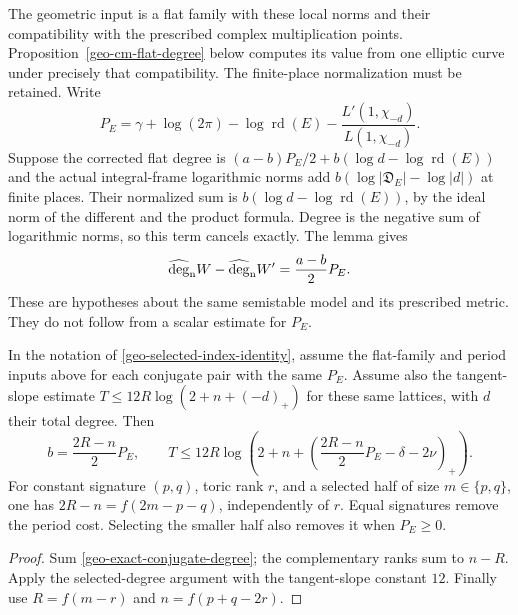The geometric input is a flat family with these local norms and their
compatibility with the prescribed complex multiplication points.
Proposition~\ref{geo-cm-flat-degree} below computes its value from one
elliptic curve under precisely that compatibility. The finite-place
normalization must be retained. Write
\[
 P_E=\gamma+\log(2\pi)-\log\operatorname{rd}(E)
                      -\frac{L'(1,\chi_{-d})}{L(1,\chi_{-d})}.
\]
Suppose the corrected flat degree is
$(a-b)P_E/2+b(\log d-\log\operatorname{rd}(E))$ and the actual
integral-frame logarithmic norms add
$b(\log|\mathfrak D_E|-\log|d|)$ at finite places. Their normalized
sum is $b(\log d-\log\operatorname{rd}(E))$, by the ideal norm
of the different and the product formula. Degree is the negative
sum of logarithmic norms, so this term cancels exactly. The lemma gives
\begin{equation}\label{geo-exact-conjugate-degree}
 \widehat{\deg}_{\rm n}W-\widehat{\deg}_{\rm n}W'
                         =\frac{a-b}{2}P_E.
\end{equation}
These are hypotheses about the same semistable model and its prescribed
metric. They do not follow from a scalar estimate for $P_E$.

\begin{corollary}\label{geo-signed-signature-budget}
In the notation of \eqref{geo-selected-index-identity}, assume the
flat-family and period inputs above for each conjugate pair with the
same $P_E$. Assume also the tangent-slope estimate
$T\le12R\log(2+n+(-d)_+)$ for these same lattices, with $d$ their
total degree. Then
\[
 b=\frac{2R-n}{2}P_E,\qquad
 T\le12R\log\left(2+n+
       \left(\frac{2R-n}{2}P_E-\delta-2\nu\right)_+\right).
\]
For constant signature $(p,q)$, toric rank $r$, and a selected half
of size $m\in\{p,q\}$, one has
$2R-n=f(2m-p-q)$, independently of $r$. Equal signatures remove
the period cost. Selecting the smaller half also removes it when
$P_E\ge0$.
\end{corollary}
\begin{proof}
Sum \eqref{geo-exact-conjugate-degree}; the complementary ranks sum
to $n-R$. Apply the selected-degree argument with the tangent-slope
constant $12$. Finally use $R=f(m-r)$ and $n=f(p+q-2r)$.
\end{proof}
